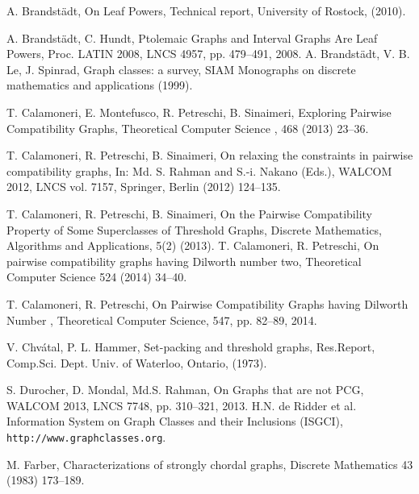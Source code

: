 \documentclass{elsarticle}
\begin{document}
\begin{thebibliography}{00}

\begin{small}


A. Brandst\"adt, On Leaf Powers, Technical report, University of Rostock, (2010).



A. Brandst\"adt, C. Hundt,
Ptolemaic Graphs and Interval Graphs Are Leaf Powers, Proc. LATIN 2008, LNCS 4957, pp. 479--491, 2008.
A. Brandst\"adt, V. B. Le,  J. Spinrad,  Graph classes: a survey,  SIAM Monographs 
on discrete mathematics and applications (1999).









 T. Calamoneri, E. Montefusco, R. Petreschi, B. Sinaimeri, Exploring Pairwise Compatibility Graphs, Theoretical Computer Science , 468 (2013) 23--36. 



T. Calamoneri, R. Petreschi,  B. Sinaimeri,  On relaxing the constraints in 
pairwise compatibility graphs, In: Md. S. Rahman and S.-i. Nakano (Eds.), WALCOM 2012, LNCS vol. 7157, Springer, Berlin (2012) 124--135.

T. Calamoneri, R. Petreschi,  B. Sinaimeri, On the Pairwise Compatibility Property of Some Superclasses of Threshold Graphs, Discrete Mathematics, Algorithms and Applications, 5(2) (2013).
T. Calamoneri, R. Petreschi, On pairwise compatibility graphs having Dilworth number two, Theoretical Computer Science 524 (2014) 34--40.

T. Calamoneri, R. Petreschi, On Pairwise Compatibility Graphs having Dilworth Number , Theoretical Computer Science, 547, pp. 82--89, 2014.


V. Chv\'atal, P. L. Hammer, Set-packing and threshold graphs, Res.Report,
Comp.Sci. Dept. Univ. of Waterloo, Ontario, (1973).

S. Durocher, D. Mondal, Md.S. Rahman, On Graphs that are not PCG, WALCOM 2013, LNCS 7748, pp. 310--321, 2013. 
H.N. de Ridder et al. Information System on Graph Classes and their Inclusions (ISGCI), {\tt http://www.graphclasses.org}.

M. Farber, Characterizations of strongly chordal graphs, Discrete Mathematics 43  (1983) 173--189.







\end{small}
\end{thebibliography}
\end{document}
